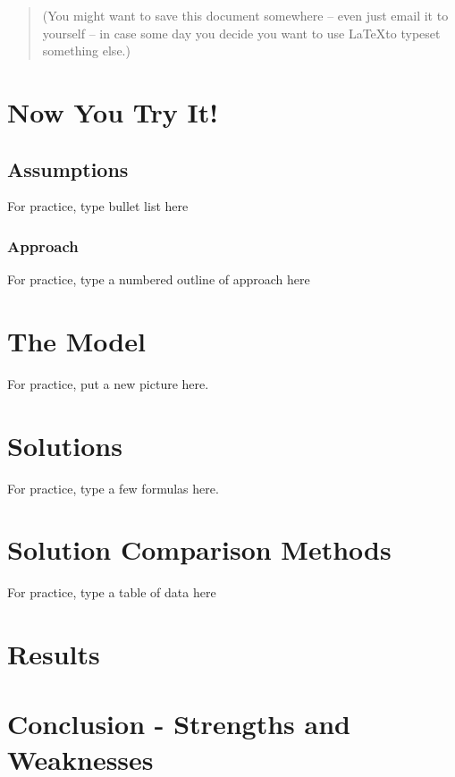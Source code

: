 \documentclass[12pt]{article}   %
\newcounter{case}
\begin{document}
\bigskip\bigskip

\begin{quote}
(You might want to save this document somewhere -- even just email it to yourself -- in
case some day you decide you want to use \LaTeX to typeset something else.)
\end{quote}


\newpage

\section{Now You Try It!}

\subsection{Assumptions}

For practice, type bullet list here

\subsubsection{Approach}

For practice, type a numbered outline of approach here

\section{The Model}

For practice, put a new picture here.

\section{Solutions}

For practice, type a few formulas here.

\section{Solution Comparison Methods}

For practice, type a table of data here

\section{Results}

\section{Conclusion - Strengths and Weaknesses}
\end{document}

